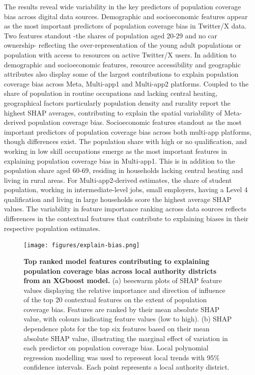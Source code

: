 \documentclass[]{rsos}%
\begin{document}
The results reveal wide variability in the key predictors of population
coverage bias across digital data sources. Demographic and socioeconomic
features appear as the most important predictors of population coverage bias in
Twitter/X data. Two features standout -the shares of population aged
20-29 and no car ownership- reflecting the over-representation of the
young adult populations or population with access to resources on active
Twitter/X users. In addition to demographic and socioeconomic features,
resource accessibility and geographic attributes also display some of
the largest contributions to explain population coverage bias across Meta,
Multi-app1 and Multi-app2 platforms. Coupled to the share of population
in routine occupations and lacking central heating, geographical factors
particularly population density and rurality report the highest SHAP
averages, contributing to explain the spatial variability of
Meta-derived population coverage bias. Socioeconomic features standout as the
most important predictors of population coverage bias across both multi-app
platforms, though differences exist. The population share with high or
no qualification, and working in low skill occupations emerge as the
most important features in explaining population coverage bias in Multi-app1.
This is in addition to the population share aged 60-69, residing in
households lacking central heating and living in rural areas. For
Multi-app2-derived estimates, the share of student population, working
in intermediate-level jobs, small employers, having a Level 4
qualification and living in large households score the highest average
SHAP values. The variability in feature importance ranking across data
sources reflects differences in the contextual features that contribute
to explaining biases in their respective population estimates.

\begin{figure}
\centering
\texttt{[image: figures/explain-bias.png]}
\caption{\textbf{Top ranked model features contributing to explaining population
coverage bias across local authority districts from an XGboost model.} (a)
beeswarm plots of SHAP feature values displaying the relative importance
and direction of influence of the top 20 contextual features on the
extent of population coverage bias. Features are ranked by their mean absolute
SHAP value, with colours indicating feature values (low to high). (b)
SHAP dependence plots for the top six features based on their mean
absolute SHAP value, illustrating the marginal effect of variation in
each predictor on population coverage bias. Local polynomial regression modelling
was used to represent local trends with 95\% confidence intervals. Each
point represents a local authority
district.}\label{fig:shap-plots}
\end{figure}
\end{document}
